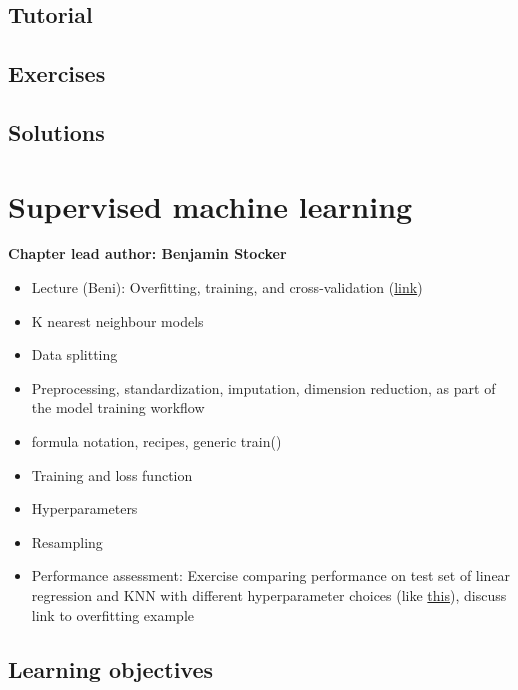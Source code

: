 \documentclass[
]{book}
\providecommand{\tightlist}{%
  \setlength{\itemsep}{0pt}\setlength{\parskip}{0pt}}
\begin{document}
\hypertarget{tutorial-7}{%
\section{Tutorial}\label{tutorial-7}}

\hypertarget{exercises-7}{%
\section{Exercises}\label{exercises-7}}

\hypertarget{solutions-7}{%
\section{Solutions}\label{solutions-7}}

\hypertarget{supervised_ml}{%
\chapter{Supervised machine learning}\label{supervised_ml}}

\textbf{Chapter lead author: Benjamin Stocker}

\begin{itemize}
\tightlist
\item
  Lecture (Beni): Overfitting, training, and cross-validation (\href{https://stineb.github.io/ml4ec_workshop/introduction.html\#overfitting}{link})
\item
  K nearest neighbour models
\item
  Data splitting
\item
  Preprocessing, standardization, imputation, dimension reduction, as part of the model training workflow
\item
  formula notation, recipes, generic train()
\item
  Training and loss function
\item
  Hyperparameters
\item
  Resampling
\item
  Performance assessment: Exercise comparing performance on test set of linear regression and KNN with different hyperparameter choices (like \href{https://stineb.github.io/ml4ec_workshop/solutions.html}{this}), discuss link to overfitting example
\end{itemize}

\hypertarget{learning-objectives-8}{%
\section{Learning objectives}\label{learning-objectives-8}}
\end{document}
